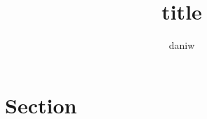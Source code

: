 \documentclass{article}
\author{daniw}
\title{title}
\begin{document}
\maketitle

\tableofcontents

\section{Section}
\end{document}
